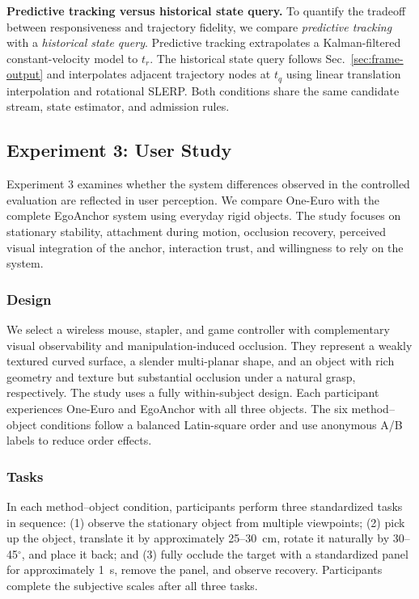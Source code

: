 \documentclass[review]{vgtc}
\begin{document}
\textbf{Predictive tracking versus historical state query.}
To quantify the tradeoff between responsiveness and trajectory fidelity, we compare \emph{predictive tracking} with a \emph{historical state query}. Predictive tracking extrapolates a Kalman-filtered constant-velocity model to $t_r$. The historical state query follows Sec.~\ref{sec:frame-output} and interpolates adjacent trajectory nodes at $t_q$ using linear translation interpolation and rotational SLERP. Both conditions share the same candidate stream, state estimator, and admission rules.

\subsection{Experiment 3: User Study}\label{sec:exp3-design}

Experiment 3 examines whether the system differences observed in the controlled evaluation are reflected in user perception. We compare One-Euro with the complete EgoAnchor system using everyday rigid objects. The study focuses on stationary stability, attachment during motion, occlusion recovery, perceived visual integration of the anchor, interaction trust, and willingness to rely on the system.

\subsubsection{Design}

We select a wireless mouse, stapler, and game controller with complementary visual observability and manipulation-induced occlusion. They represent a weakly textured curved surface, a slender multi-planar shape, and an object with rich geometry and texture but substantial occlusion under a natural grasp, respectively. The study uses a fully within-subject design. Each participant experiences One-Euro and EgoAnchor with all three objects. The six method--object conditions follow a balanced Latin-square order and use anonymous A/B labels to reduce order effects.

\subsubsection{Tasks}

In each method--object condition, participants perform three standardized tasks in sequence: (1) observe the stationary object from multiple viewpoints; (2) pick up the object, translate it by approximately 25--30~cm, rotate it naturally by 30--45$^\circ$, and place it back; and (3) fully occlude the target with a standardized panel for approximately 1~s, remove the panel, and observe recovery. Participants complete the subjective scales after all three tasks.
\end{document}
